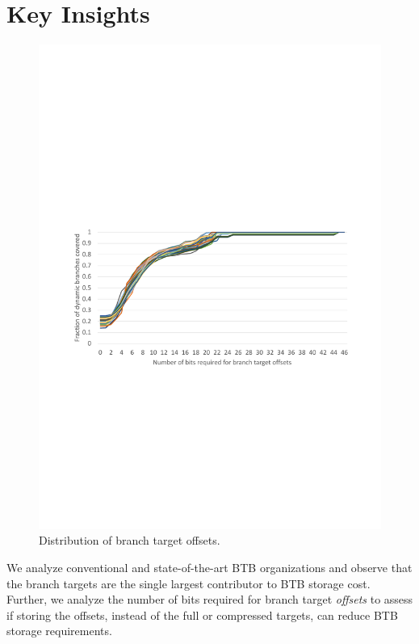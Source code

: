 \section{Key Insights}

\begin{figure}[t!]
    \centering
    \includegraphics[width=\columnwidth, trim=60 280 50 320, clip]{figures/offset_distribution.pdf}
    \vspace{-0.25in}
    \caption{Distribution of branch target offsets.}
    \vspace{-0.25in}
    \label{fig:offsets}
\end{figure}

We analyze conventional and state-of-the-art BTB organizations and observe that the branch targets are the single largest contributor to BTB storage cost. Further, we analyze the number of bits required for branch target \emph{offsets} to assess if storing the offsets, instead of the full or compressed targets, can reduce BTB storage requirements. 

